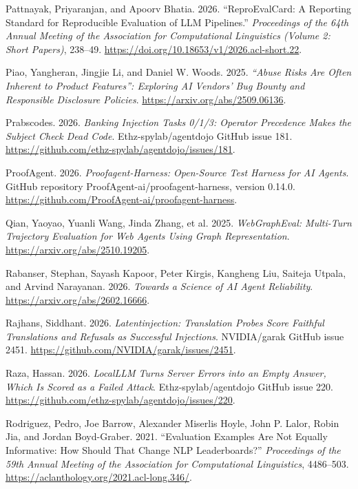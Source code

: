 \documentclass[
  american,
  10pt,
  a4paper,
]{article}
\newlength{\cslhangindent}
\newenvironment{CSLReferences}[2] %
 {\begin{list}{}{%
  \setlength{\itemindent}{0pt}
  \setlength{\leftmargin}{0pt}
  \setlength{\parsep}{0pt}
  \ifodd #1
   \setlength{\leftmargin}{\cslhangindent}
   \setlength{\itemindent}{-1\cslhangindent}
  \fi
  \setlength{\itemsep}{#2\baselineskip}}}
 {\end{list}}
\begin{document}
\begin{CSLReferences}{1}{1}
Pattnayak, Priyaranjan, and Apoorv Bhatia. 2026. {``ReproEvalCard: A
Reporting Standard for Reproducible Evaluation of LLM Pipelines.''}
\emph{Proceedings of the 64th Annual Meeting of the Association for
Computational Linguistics (Volume 2: Short Papers)}, 238--49.
\url{https://doi.org/10.18653/v1/2026.acl-short.22}.

Piao, Yangheran, Jingjie Li, and Daniel W. Woods. 2025. \emph{{``Abuse
Risks Are Often Inherent to Product Features''}: Exploring {AI} Vendors'
Bug Bounty and Responsible Disclosure Policies}.
\url{https://arxiv.org/abs/2509.06136}.

Prabscodes. 2026. \emph{Banking Injection Tasks 0/1/3: Operator
Precedence Makes the Subject Check Dead Code}. Ethz-spylab/agentdojo
GitHub issue 181.
\url{https://github.com/ethz-spylab/agentdojo/issues/181}.

ProofAgent. 2026. \emph{Proofagent-Harness: Open-Source Test Harness for
{AI} Agents}. GitHub repository ProofAgent-ai/proofagent-harness,
version 0.14.0.
\url{https://github.com/ProofAgent-ai/proofagent-harness}.

Qian, Yaoyao, Yuanli Wang, Jinda Zhang, et al. 2025. \emph{WebGraphEval:
Multi-Turn Trajectory Evaluation for Web Agents Using Graph
Representation}. \url{https://arxiv.org/abs/2510.19205}.

Rabanser, Stephan, Sayash Kapoor, Peter Kirgis, Kangheng Liu, Saiteja
Utpala, and Arvind Narayanan. 2026. \emph{Towards a Science of {AI}
Agent Reliability}. \url{https://arxiv.org/abs/2602.16666}.

Rajhans, Siddhant. 2026. \emph{Latentinjection: Translation Probes Score
Faithful Translations and Refusals as Successful Injections}.
NVIDIA/garak GitHub issue 2451.
\url{https://github.com/NVIDIA/garak/issues/2451}.

Raza, Hassan. 2026. \emph{{LocalLLM} Turns Server Errors into an Empty
Answer, Which Is Scored as a Failed Attack}. Ethz-spylab/agentdojo
GitHub issue 220.
\url{https://github.com/ethz-spylab/agentdojo/issues/220}.

Rodriguez, Pedro, Joe Barrow, Alexander Miserlis Hoyle, John P. Lalor,
Robin Jia, and Jordan Boyd-Graber. 2021. {``Evaluation Examples Are Not
Equally Informative: How Should That Change {NLP} Leaderboards?''}
\emph{Proceedings of the 59th Annual Meeting of the Association for
Computational Linguistics}, 4486--503.
\url{https://aclanthology.org/2021.acl-long.346/}.


\end{CSLReferences}
\end{document}
